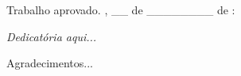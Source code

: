 \documentclass[
	12pt,				%
	twoside,			%
	a4paper,			%
	chapter=TITLE,		%
	section=TITLE,		%
	subsection=TITLE,	%
	subsubsection=TITLE,%
	english,			%
	french,				%
	spanish,			%
	brazil,				%
	]{abntex2}
\begin{document}
%     
\begin{folhadeaprovacao}
	\begin{center}
		{\ABNTEXchapterfont\large\imprimirautor}

		\vspace*{\fill}\vspace*{\fill}
		\begin{center}
			\ABNTEXchapterfont\bfseries\Large\imprimirtitulo
		\end{center}
		\vspace*{\fill}

		\hspace{.45\textwidth}
		\begin{minipage}{.5\textwidth}
			\imprimirpreambulo
		\end{minipage}%
		\vspace*{\fill}
	\end{center}

	Trabalho aprovado. \imprimirlocal, \_\_ de \_\_\_\_\_\_\_\_ de \imprimirdata:


	\begin{center}
		\vspace*{0.5cm}
		{\large\imprimirlocal}
		\par
		{\large\imprimirdata}
		\vspace*{1cm}
	\end{center}
\end{folhadeaprovacao}

\begin{dedicatoria}
	\vspace*{\fill}
	\centering
	\noindent
	\textit{Dedicatória aqui...}
	\vspace*{\fill}
\end{dedicatoria}

\begin{agradecimentos}
	Agradecimentos...
\end{agradecimentos}
\end{document}
